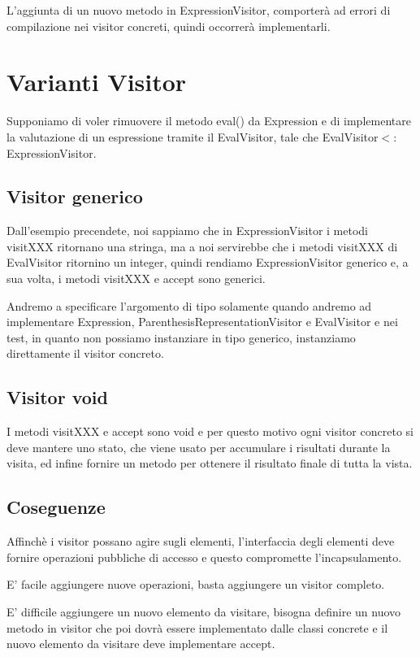 L'aggiunta di un nuovo metodo in ExpressionVisitor, comporterà ad errori di compilazione nei visitor concreti, quindi occorrerà implementarli.

\section{Varianti Visitor}

Supponiamo di voler rimuovere il metodo eval() da Expression e di implementare la valutazione di un espressione tramite il EvalVisitor, tale che 
EvalVisitor$<:$ExpressionVisitor.

\subsection{Visitor generico}

Dall'esempio precendete, noi sappiamo che in ExpressionVisitor i metodi visitXXX ritornano una stringa, ma a noi servirebbe che i metodi visitXXX di EvalVisitor 
ritornino un integer, quindi rendiamo ExpressionVisitor generico e, a sua volta, i metodi visitXXX e accept sono generici.

Andremo a specificare l'argomento di tipo solamente quando andremo ad implementare Expression, ParenthesisRepresentationVisitor e EvalVisitor e nei test, in quanto non 
possiamo instanziare in tipo generico, instanziamo direttamente il visitor concreto.

\subsection{Visitor void}

I metodi visitXXX e accept sono void e per questo motivo ogni visitor concreto si deve mantere uno stato, che viene usato per accumulare i risultati durante la visita, 
ed infine fornire un metodo per ottenere il risultato finale di tutta la vista.

\subsection{Coseguenze}

Affinchè i visitor possano agire sugli elementi, l'interfaccia degli elementi deve fornire operazioni pubbliche di accesso e questo compromette l'incapsulamento.

E' facile aggiungere nuove operazioni, basta aggiungere un visitor completo.

E' difficile aggiungere un nuovo elemento da visitare, bisogna definire un nuovo metodo in visitor che poi dovrà essere implementato dalle classi concrete e il nuovo 
elemento da visitare deve implementare accept.

